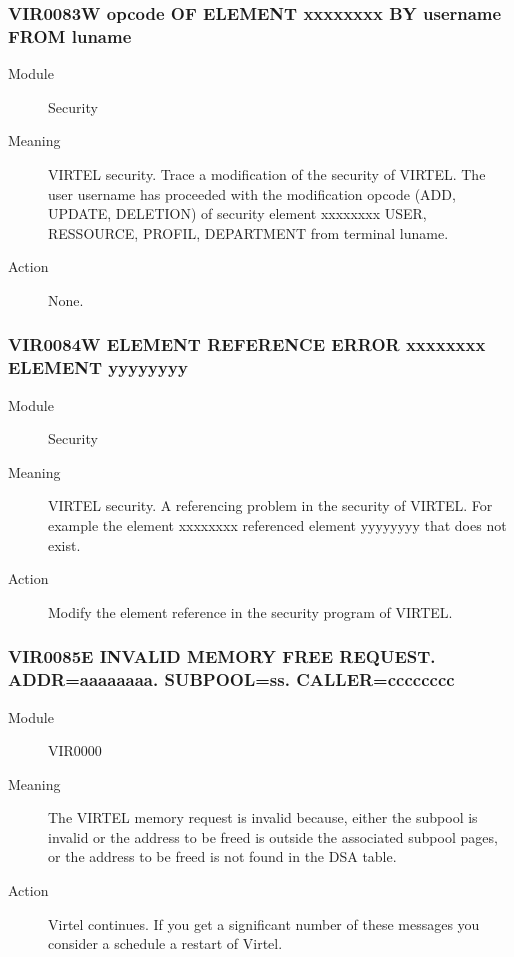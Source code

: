 \documentclass[letterpaper,10pt,english]{sphinxmanual}
\begin{document}
\subsubsection{VIR0083W opcode OF ELEMENT xxxxxxxx BY username FROM luname}
\label{\detokenize{messages:vir0083w-opcode-of-element-xxxxxxxx-by-username-from-luname}}\begin{description}
\item[{Module}] \leavevmode
Security

\item[{Meaning}] \leavevmode
VIRTEL security. Trace a modification of the security of VIRTEL. The user username has proceeded with the modification opcode (ADD, UPDATE, DELETION) of security element xxxxxxxx USER, RESSOURCE, PROFIL, DEPARTMENT from terminal luname.

\item[{Action}] \leavevmode
None.

\end{description}


\subsubsection{VIR0084W ELEMENT REFERENCE ERROR xxxxxxxx ELEMENT yyyyyyyy}
\label{\detokenize{messages:vir0084w-element-reference-error-xxxxxxxx-element-yyyyyyyy}}\begin{description}
\item[{Module}] \leavevmode
Security

\item[{Meaning}] \leavevmode
VIRTEL security. A referencing problem in the security of VIRTEL. For example the element xxxxxxxx referenced element yyyyyyyy that does not exist.

\item[{Action}] \leavevmode
Modify the element reference in the security program of VIRTEL.

\end{description}


\subsubsection{VIR0085E INVALID MEMORY FREE REQUEST. ADDR=aaaaaaaa. SUBPOOL=ss. CALLER=cccccccc}
\label{\detokenize{messages:vir0085e-invalid-memory-free-request-addr-aaaaaaaa-subpool-ss-caller-cccccccc}}\begin{description}
\item[{Module}] \leavevmode
VIR0000

\item[{Meaning}] \leavevmode
The VIRTEL memory request is invalid because, either the subpool is invalid or the address to be freed is outside the associated subpool pages, or the address to be freed is not found in the DSA table.

\item[{Action}] \leavevmode
Virtel continues. If you get a significant number of these messages you consider a schedule a restart of Virtel.

\end{description}
\end{document}
